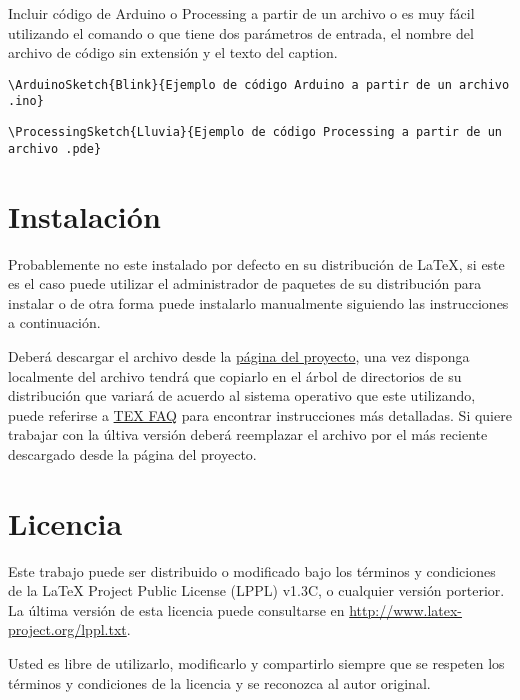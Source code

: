 \documentclass[10pt,a4paper]{article}
\begin{document}
Incluir código de Arduino o Processing a partir de un archivo  o  es muy fácil utilizando el comando  o  que tiene dos parámetros de entrada, el nombre del archivo de código sin extensión y el texto del caption.

\begin{verbatim}
\ArduinoSketch{Blink}{Ejemplo de código Arduino a partir de un archivo .ino}
\end{verbatim}


\begin{verbatim}
\ProcessingSketch{Lluvia}{Ejemplo de código Processing a partir de un archivo .pde}
\end{verbatim}


\section{Instalación}

Probablemente  no este instalado por defecto en su distribución de \LaTeX{}, si este es el caso puede utilizar el administrador de paquetes de su distribución para instalar  o de otra forma puede instalarlo manualmente siguiendo las instrucciones a continuación.

Deberá descargar el archivo  desde la \href{https://github.com/piratax007/maker_LaTeX_package}{página del proyecto}, una vez disponga localmente del archivo  tendrá que copiarlo en el árbol de directorios de su distribución que variará de acuerdo al sistema operativo que este utilizando, puede referirse a \href{http://www.tex.ac.uk/cgi-bin/texfaq2html?label=inst-wlcf}{TEX FAQ} para encontrar instrucciones más detalladas. Si quiere trabajar con la últiva versión deberá reemplazar el archivo  por el más reciente descargado desde la página del proyecto.

\section{Licencia}

Este trabajo puede ser distribuido o modificado bajo los términos y condiciones de la LaTeX Project Public License (LPPL) v1.3C, o cualquier versión porterior. La última versión de esta licencia puede consultarse en \url{http://www.latex-project.org/lppl.txt}.

Usted es libre de utilizarlo, modificarlo y compartirlo siempre que se respeten los términos y condiciones de la licencia y se reconozca al autor original.
\end{document}
